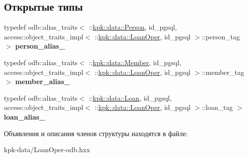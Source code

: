 \subsection*{Открытые типы}
\begin{DoxyCompactItemize}
\item 
typedef odb\+::alias\+\_\+traits$<$ \+::\hyperlink{classkpk_1_1data_1_1_person}{kpk\+::data\+::\+Person}, id\+\_\+pgsql, access\+::object\+\_\+traits\+\_\+impl$<$ \+::\hyperlink{classkpk_1_1data_1_1_loan_oper}{kpk\+::data\+::\+Loan\+Oper}, id\+\_\+pgsql $>$\+::person\+\_\+tag $>$ {\bfseries person\+\_\+alias\+\_\+}\hypertarget{structodb_1_1query__columns__base_3_01_1_1kpk_1_1data_1_1_loan_oper_00_01id__pgsql_01_4_a4d968cdfe76aca11e04f9e70a33feb67}{}\label{structodb_1_1query__columns__base_3_01_1_1kpk_1_1data_1_1_loan_oper_00_01id__pgsql_01_4_a4d968cdfe76aca11e04f9e70a33feb67}

\item 
typedef odb\+::alias\+\_\+traits$<$ \+::\hyperlink{classkpk_1_1data_1_1_member}{kpk\+::data\+::\+Member}, id\+\_\+pgsql, access\+::object\+\_\+traits\+\_\+impl$<$ \+::\hyperlink{classkpk_1_1data_1_1_loan_oper}{kpk\+::data\+::\+Loan\+Oper}, id\+\_\+pgsql $>$\+::member\+\_\+tag $>$ {\bfseries member\+\_\+alias\+\_\+}\hypertarget{structodb_1_1query__columns__base_3_01_1_1kpk_1_1data_1_1_loan_oper_00_01id__pgsql_01_4_aa764a3c2e1e171eb7745504148223801}{}\label{structodb_1_1query__columns__base_3_01_1_1kpk_1_1data_1_1_loan_oper_00_01id__pgsql_01_4_aa764a3c2e1e171eb7745504148223801}

\item 
typedef odb\+::alias\+\_\+traits$<$ \+::\hyperlink{classkpk_1_1data_1_1_loan}{kpk\+::data\+::\+Loan}, id\+\_\+pgsql, access\+::object\+\_\+traits\+\_\+impl$<$ \+::\hyperlink{classkpk_1_1data_1_1_loan_oper}{kpk\+::data\+::\+Loan\+Oper}, id\+\_\+pgsql $>$\+::loan\+\_\+tag $>$ {\bfseries loan\+\_\+alias\+\_\+}\hypertarget{structodb_1_1query__columns__base_3_01_1_1kpk_1_1data_1_1_loan_oper_00_01id__pgsql_01_4_accca0aa297e23da80ab680681ab36372}{}\label{structodb_1_1query__columns__base_3_01_1_1kpk_1_1data_1_1_loan_oper_00_01id__pgsql_01_4_accca0aa297e23da80ab680681ab36372}

\end{DoxyCompactItemize}


Объявления и описания членов структуры находятся в файле\+:\begin{DoxyCompactItemize}
\item 
kpk-\/data/Loan\+Oper-\/odb.\+hxx\end{DoxyCompactItemize}
